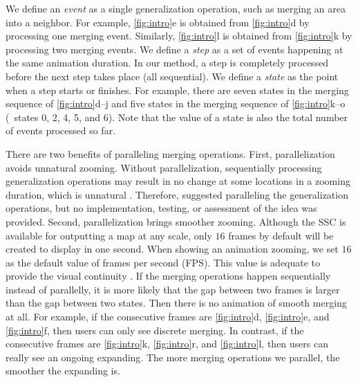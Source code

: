 \documentclass{ica}
\begin{document}
We define an \emph{event} as a single generalization operation, 
such as merging an area into a neighbor.
For example, \fig\ref{fig:intro}e is obtained from 
\fig\ref{fig:intro}d by processing one merging event.
Similarly, \fig\ref{fig:intro}l is obtained from 
\fig\ref{fig:intro}k by processing two merging events.
We define a \emph{step} as 
a set of events happening at the same animation duration.
In our method, a step is completely processed 
before the next step takes place (all sequential).
We define a \emph{state} as the point when a step starts or finishes.
For example, there are seven states 
in the merging sequence of \figs\ref{fig:intro}d--j
and five states in the merging sequence of \figs\ref{fig:intro}k--o 
(\ie~states 0, 2, 4, 5, and 6).
Note that the value of a state is also 
the total number of events processed so far.

There are two benefits of paralleling merging operations.
First, parallelization avoids unnatural zooming.
Without parallelization,
sequentially processing generalization operations 
may result in no change at some locations in a zooming duration, 
which is unnatural \citep{vanOosterom2014Support}. 
Therefore, \citet{vanOosterom2014Support} 
suggested paralleling the generalization operations,
but no implementation, testing, or assessment of the idea was provided.
Second, parallelization brings smoother zooming.
Although the SSC is available for outputting a map at any scale,
only $16$ frames by default will be created to display in one second.
When showing an animation zooming, 
we set $16$ as the default value of frames per second (FPS).
This value is adequate to provide the visual continuity
\citep[]{Read2000Film}.
If the merging operations happen sequentially instead of parallelly,
it is more likely that
the gap between two frames is larger than the gap between two states.
Then there is no animation of smooth merging at all.
For example, if the consecutive frames are 
\figs\ref{fig:intro}d, \ref{fig:intro}e, and \ref{fig:intro}f,
then users can only see discrete merging.
In contrast, if the consecutive frames are 
\figs\ref{fig:intro}k, \ref{fig:intro}r, and \ref{fig:intro}l,
then users can really see an ongoing expanding. 
The more merging operations we parallel, the smoother the expanding is.

\end{document}
